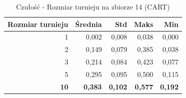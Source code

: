 \begin{table}[htbp]
\centering
\small
\setlength{\tabcolsep}{6pt}
\renewcommand{\arraystretch}{1.2}
\caption{Czułość - Rozmiar turnieju na zbiorze 14 (CART)}
\label{tab:CART_tournament_size_14_recall}
\begin{tabular}{r|r|r|r|r}
\toprule
Rozmiar turnieju & Średnia & Std & Maks & Min \\
\hline
1 & 0,002 & 0,008 & 0,038 & 0,000 \\
2 & 0,149 & 0,079 & 0,385 & 0,038 \\
3 & 0,214 & 0,084 & 0,423 & 0,077 \\
5 & 0,295 & 0,095 & 0,500 & 0,115 \\
\textbf{10} & \textbf{0,383} & \textbf{0,102} & \textbf{0,577} & \textbf{0,192} \\
\bottomrule
\end{tabular}
\end{table}